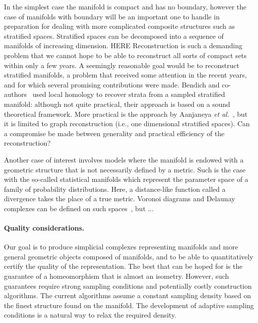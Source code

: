In the simplest case the manifold is compact and has no boundary,
however the case of manifolds with boundary will be an important one
to handle in preparation for dealing with more complicated composite
structures such as stratified spaces. Stratified spaces can be
decomposed into a sequence of manifolds of increasing
dimension.
%
HERE
Reconstruction is such a demanding problem that we cannot hope to be
able to reconstruct all sorts of compact sets within only a few
years. A seemingly reasonable goal would be to reconstruct stratified
manifolds, a problem that received some attention in the recent years,
and for which several promising contributions were made.  Bendich and
co-authors~\cite{bendich-PhD,bendich-strat1,bendich-strat2} used local
homology to recover strata from a sampled stratified manifold:
although not quite practical, their approach is based on a sound
theoretical framework. More practical is the approach by Aanjaneya
{\em et al.}~\cite{metric-graphs-reconstruction}, but it is limited to
graph reconstruction (i.e., one dimensional stratified spaces). Can a
compromise be made between generality and practical efficiency of the
reconstruction?
%

Another case of interest involves models where the manifold is endowed
with a geometric structure that is not necessarily defined by a
metric. Such is the case with the so-called statistical manifolds
which represent the parameter space of a family of probability
distributions. Here, a distance-like function called a divergence
takes the place of a true metric.  Voronoi diagrams and Delaunay
complexes can be defined on such
spaces~\cite{onishi1998,boissonnat2010bregvor}, but ...



\paragraph{Quality considerations.}

Our goal is to produce simplicial complexes representing manifolds and
more general geometric objects composed of manifolds, and to be able
to quantitatively certify the quality of the representation. The best
that can be hoped for is the guarantee of a homeomorphism that is
almost an isometry. However, such guarantees require strong sampling
conditions and potentially costly construction algorithms. The current
algorithms assume a constant sampling density based on the finest
structure found on the manifold. The development of adaptive sampling
conditions is a natural way to relax the required density. 

